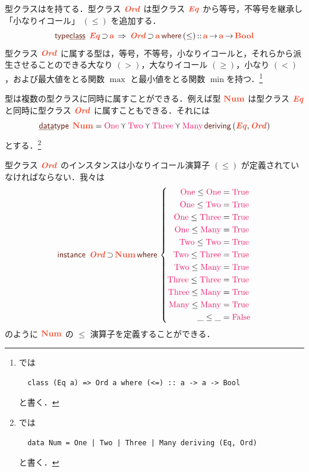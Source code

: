 \documentclass[a5paper,twoside,fleqn,draft]{jsbook}
\begin{document}

型クラスはを持てる．型クラス $\mOrdTypeClass$ は型クラス $\mEqTypeClass$ から等号，不等号を継承し「小なりイコール」 $(\le)$ を追加する．
\begin{equation}
  \mTypeClassDecl\;\mEqTypeClass\mSuperSet\mA
  \mSuperClass\mathop{\mOrdTypeClass}\mSuperSet\mA
  \mWhere{}(\le)\mIn\mProjEXP{\mA }{\mProjEXP{\mA }{\mBoolType}}
\end{equation}
型クラス $\mOrdTypeClass$ に属する型は，等号，不等号，小なりイコールと，それらから派生させることのできる大なり $(>)$，大なりイコール $(\ge)$，小なり $(<)$，および最大値をとる関数 $\max$ と最小値をとる関数 $\min$を持つ．\footnote{\haskell では
\begin{verbatim}
  class (Eq a) => Ord a where (<=) :: a -> a -> Bool
\end{verbatim}
と書く．}

\separator

型は複数の型クラスに同時に属すことができる．例えば型 $\mType{Num}$ は型クラス $\mEqTypeClass$ と同時に型クラス $\mOrdTypeClass$ に属すこともできる．それには
\begin{equation}
\mDataType\;\mType{Num}
=\mNumOne\mValueOr\mNumTwo\mValueOr\mNumThree\mValueOr\mNumMany
\mDeriving{}(\mEqTypeClass,\mOrdTypeClass)
\end{equation}
とする．\footnote{\haskell では
\begin{verbatim}
  data Num = One | Two | Three | Many deriving (Eq, Ord)
\end{verbatim}
と書く．}

型クラス $\mOrdTypeClass$ のインスタンスは小なりイコール演算子 $(\le)$ が定義されていなければならない．我々は
\begin{equation}
  \mInstanceDecl\;\mOrdTypeClass\mSuperSet\mType{Num}
  \mWhere{}
  \left\{
  \begin{aligned}
    \mNumOne\le\mNumOne&=\hTrue\\
    \mNumOne\le\mNumTwo&=\hTrue\\
    \mNumOne\le\mNumThree&=\hTrue\\
    \mNumOne\le\mNumMany&=\hTrue\\
    \mNumTwo\le\mNumTwo&=\hTrue\\
    \mNumTwo\le\mNumThree&=\hTrue\\
    \mNumTwo\le\mNumMany&=\hTrue\\
    \mNumThree\le\mNumThree&=\hTrue\\
    \mNumThree\le\mNumMany&=\hTrue\\
    \mNumMany\le\mNumMany&=\hTrue\\
    \_\le\_&=\hFalse
  \end{aligned}
  \right.
\end{equation}
のように $\mType{Num}$ の $\le$ 演算子を定義することができる．
\end{document}
